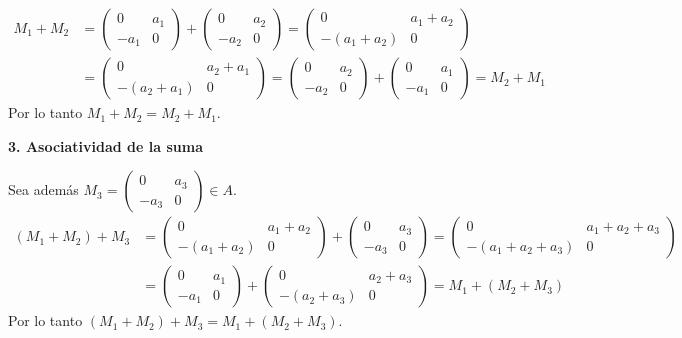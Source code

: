 \documentclass[12pt]{article}
\begin{document}
\begin{enumerate}[label=\alph*.-]
    \begin{align*}
    M_1+M_2 &= \begin{pmatrix}0 & a_1\\ -a_1 & 0\end{pmatrix}+\begin{pmatrix}0 & a_2\\ -a_2 & 0\end{pmatrix} = \begin{pmatrix}0 & a_1+a_2\\ -(a_1+a_2) & 0\end{pmatrix}\\
    &= \begin{pmatrix}0 & a_2+a_1\\ -(a_2+a_1) & 0\end{pmatrix} = \begin{pmatrix}0 & a_2\\ -a_2 & 0\end{pmatrix}+\begin{pmatrix}0 & a_1\\ -a_1 & 0\end{pmatrix} = M_2+M_1
    \end{align*}
    Por lo tanto $M_1+M_2=M_2+M_1$.

    \textbf{3. Asociatividad de la suma}

    Sea además $M_3=\begin{pmatrix}0 & a_3\\ -a_3 & 0\end{pmatrix} \in A$.
    \begin{align*}
    (M_1+M_2)+M_3 &= \begin{pmatrix}0 & a_1+a_2\\ -(a_1+a_2) & 0\end{pmatrix}+\begin{pmatrix}0 & a_3\\ -a_3 & 0\end{pmatrix} = \begin{pmatrix}0 & a_1+a_2+a_3\\ -(a_1+a_2+a_3) & 0\end{pmatrix}\\
    &= \begin{pmatrix}0 & a_1\\ -a_1 & 0\end{pmatrix}+\begin{pmatrix}0 & a_2+a_3\\ -(a_2+a_3) & 0\end{pmatrix} = M_1+(M_2+M_3)
    \end{align*}
    Por lo tanto $(M_1+M_2)+M_3=M_1+(M_2+M_3)$.


\end{enumerate}
\end{document}
